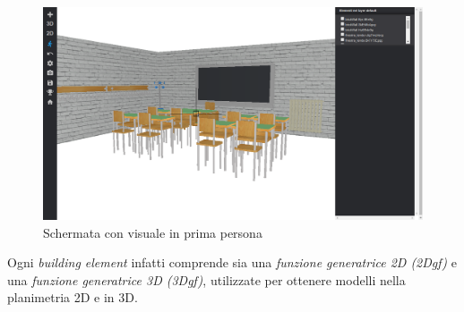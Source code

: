 \begin{figure}[htbp] %
   \centering
   \includegraphics[width=1\linewidth]{images/1d-school}
   \caption{Schermata con visuale in prima persona}
   \label{fig:1D-school}
\end{figure}

Ogni \emph{building element} infatti comprende sia una \emph{funzione generatrice 2D (2Dgf)} e una
\emph{funzione generatrice 3D (3Dgf)}, utilizzate per ottenere modelli nella planimetria 2D e in 3D.
\newpage
